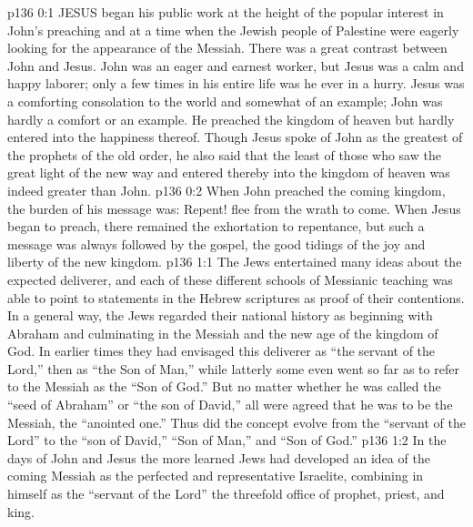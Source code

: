 \vs p136 0:1 JESUS began his public work at the height of the popular interest in John’s preaching and at a time when the Jewish people of Palestine were eagerly looking for the appearance of the Messiah. There was a great contrast between John and Jesus. John was an eager and earnest worker, but Jesus was a calm and happy laborer; only a few times in his entire life was he ever in a hurry. Jesus was a comforting consolation to the world and somewhat of an example; John was hardly a comfort or an example. He preached the kingdom of heaven but hardly entered into the happiness thereof. Though Jesus spoke of John as the greatest of the prophets of the old order, he also said that the least of those who saw the great light of the new way and entered thereby into the kingdom of heaven was indeed greater than John.
\vs p136 0:2 When John preached the coming kingdom, the burden of his message was: Repent! flee from the wrath to come. When Jesus began to preach, there remained the exhortation to repentance, but such a message was always followed by the gospel, the good tidings of the joy and liberty of the new kingdom.
\vs p136 1:1 The Jews entertained many ideas about the expected deliverer, and each of these different schools of Messianic teaching was able to point to statements in the Hebrew scriptures as proof of their contentions. In a general way, the Jews regarded their national history as beginning with Abraham and culminating in the Messiah and the new age of the kingdom of God. In earlier times they had envisaged this deliverer as “the servant of the Lord,” then as “the Son of Man,” while latterly some even went so far as to refer to the Messiah as the “Son of God.” But no matter whether he was called the “seed of Abraham” or “the son of David,” all were agreed that he was to be the Messiah, the “anointed one.” Thus did the concept evolve from the “servant of the Lord” to the “son of David,” “Son of Man,” and “Son of God.”
\vs p136 1:2 In the days of John and Jesus the more learned Jews had developed an idea of the coming Messiah as the perfected and representative Israelite, combining in himself as the “servant of the Lord” the threefold office of prophet, priest, and king.
